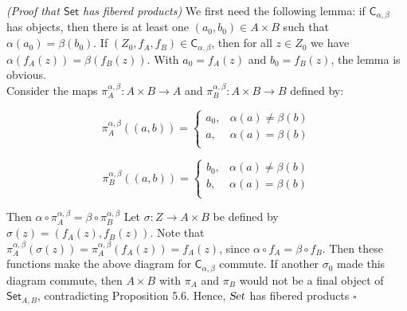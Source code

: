\documentclass[11pt,a4paper]{article}
\begin{document}
\begin{center}
\end{center}

\noindent \textit{(Proof that $\textsf{Set}$ has fibered products)}  We first need the following lemma: if $\textsf{C}_{\alpha, \beta}$ has objects, then there is at least one $(a_0, b_0) \in A \times B$ such that $\alpha(a_0) = \beta(b_0)$.  If $(Z_0, f_A, f_B) \in \textsf{C}_{\alpha, \beta}$, then for all $z \in Z_0$ we have $\alpha(f_A(z)) = \beta(f_B(z))$.  With $a_0 = f_A(z)$ and $b_0 = f_B(z)$, the lemma is obvious. \\

\noindent Consider the maps $\pi^{\alpha,\beta}_A: A \times B \rightarrow A$ and $\pi^{\alpha,\beta}_B: A \times B \rightarrow B$ defined by:

\[\pi^{\alpha,\beta}_A((a,b)) =   \left\{
\begin{array}{ll}
      a_0, & \alpha(a) \neq \beta(b)  \\
      a, & \alpha(a) = \beta(b) \\
\end{array} 
\right. \]

\[\pi^{\alpha,\beta}_B((a,b)) =   \left\{
\begin{array}{ll}
      b_0, & \alpha(a) \neq \beta(b)  \\
      b, & \alpha(a) = \beta(b) \\
\end{array} 
\right. \]



\noindent  Then $\alpha \circ \pi^{\alpha,\beta}_A = \beta \circ \pi^{\alpha,\beta}_B$ Let $\sigma: Z \rightarrow A \times B$ be defined by $\sigma(z) = (f_A(z), f_B(z))$.  Note that $\pi^{\alpha, \beta}_A(\sigma(z)) = \pi^{\alpha, \beta}_A(f_A(z)) = f_A(z)$, since $\alpha \circ f_A = \beta \circ f_B$. Then these functions make the above diagram for $\textsf{C}_{\alpha, \beta}$ commute.  If another $\sigma_0$ made this diagram commute, then $A \times B$ with $\pi_A$ and $\pi_B$ would not be a final object of $\textsf{Set}_{A,B}$, contradicting Proposition 5.6.  Hence, $\textsl{Set}$ has fibered products $\square$ \\
\end{document}
